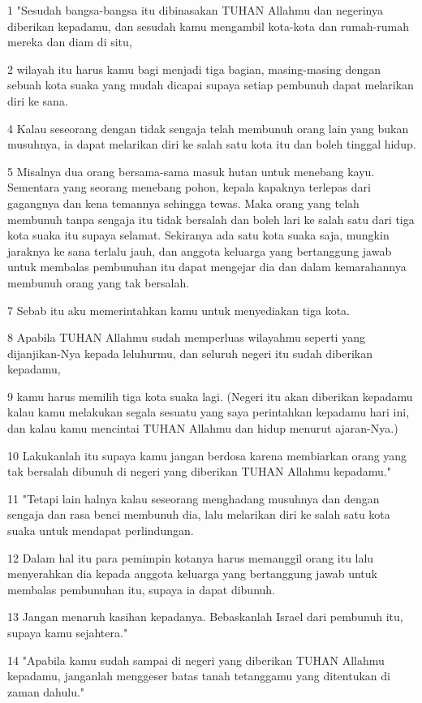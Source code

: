 \par 1 "Sesudah bangsa-bangsa itu dibinasakan TUHAN Allahmu dan negerinya diberikan kepadamu, dan sesudah kamu mengambil kota-kota dan rumah-rumah mereka dan diam di situ,
\par 2 wilayah itu harus kamu bagi menjadi tiga bagian, masing-masing dengan sebuah kota suaka yang mudah dicapai supaya setiap pembunuh dapat melarikan diri ke sana.
\par 4 Kalau seseorang dengan tidak sengaja telah membunuh orang lain yang bukan musuhnya, ia dapat melarikan diri ke salah satu kota itu dan boleh tinggal hidup.
\par 5 Misalnya dua orang bersama-sama masuk hutan untuk menebang kayu. Sementara yang seorang menebang pohon, kepala kapaknya terlepas dari gagangnya dan kena temannya sehingga tewas. Maka orang yang telah membunuh tanpa sengaja itu tidak bersalah dan boleh lari ke salah satu dari tiga kota suaka itu supaya selamat. Sekiranya ada satu kota suaka saja, mungkin jaraknya ke sana terlalu jauh, dan anggota keluarga yang bertanggung jawab untuk membalas pembunuhan itu dapat mengejar dia dan dalam kemarahannya membunuh orang yang tak bersalah.
\par 7 Sebab itu aku memerintahkan kamu untuk menyediakan tiga kota.
\par 8 Apabila TUHAN Allahmu sudah memperluas wilayahmu seperti yang dijanjikan-Nya kepada leluhurmu, dan seluruh negeri itu sudah diberikan kepadamu,
\par 9 kamu harus memilih tiga kota suaka lagi. (Negeri itu akan diberikan kepadamu kalau kamu melakukan segala sesuatu yang saya perintahkan kepadamu hari ini, dan kalau kamu mencintai TUHAN Allahmu dan hidup menurut ajaran-Nya.)
\par 10 Lakukanlah itu supaya kamu jangan berdosa karena membiarkan orang yang tak bersalah dibunuh di negeri yang diberikan TUHAN Allahmu kepadamu."
\par 11 "Tetapi lain halnya kalau seseorang menghadang musuhnya dan dengan sengaja dan rasa benci membunuh dia, lalu melarikan diri ke salah satu kota suaka untuk mendapat perlindungan.
\par 12 Dalam hal itu para pemimpin kotanya harus memanggil orang itu lalu menyerahkan dia kepada anggota keluarga yang bertanggung jawab untuk membalas pembunuhan itu, supaya ia dapat dibunuh.
\par 13 Jangan menaruh kasihan kepadanya. Bebaskanlah Israel dari pembunuh itu, supaya kamu sejahtera."
\par 14 "Apabila kamu sudah sampai di negeri yang diberikan TUHAN Allahmu kepadamu, janganlah menggeser batas tanah tetanggamu yang ditentukan di zaman dahulu."
